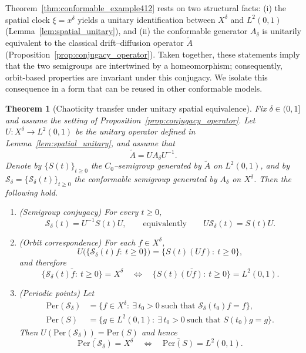 \documentclass[preprint,12pt]{elsarticle}
\newtheorem{theorem}{Theorem}
\begin{document}
Theorem~\ref{thm:conformable_example412} rests on two structural facts:
(i) the spatial clock $\xi=x^\delta$ yields a unitary identification between $X^\delta$
and $L^2(0,1)$ (Lemma~\ref{lem:spatial_unitary}), and
(ii) the conformable generator $A_\delta$ is unitarily equivalent to the classical
drift--diffusion operator $\widetilde A$ (Proposition~\ref{prop:conjugacy_operator}).
Taken together, these statements imply that the two semigroups are intertwined by a
homeomorphism; consequently, orbit-based properties are invariant under this conjugacy.
We isolate this consequence in a form that can be reused in other conformable models.

\begin{theorem}[Chaoticity transfer under unitary spatial equivalence]\label{thm:app_diffusion_transport_2}
Fix $\delta\in(0,1]$ and assume the setting of Proposition~\ref{prop:conjugacy_operator}.
Let $U:X^\delta\to L^2(0,1)$ be the unitary operator defined in Lemma~\ref{lem:spatial_unitary},
and assume that
\begin{equation}\label{eq:app2_generator_equivalence}
\widetilde A = U A_\delta U^{-1}.
\end{equation}
Denote by $\{S(t)\}_{t\ge0}$ the $C_0$--semigroup generated by $\widetilde A$ on $L^2(0,1)$, and by
$\mathcal S_\delta=\{\mathcal S_\delta(t)\}_{t\ge0}$ the conformable semigroup generated by $A_\delta$
on $X^\delta$. Then the following hold.
\begin{enumerate}
\item \emph{(Semigroup conjugacy)} For every $t\ge0$,
\begin{equation}\label{eq:app2_Sdelta_conjugacy}
\mathcal S_\delta(t)=U^{-1}S(t)U,
\qquad\text{equivalently}\qquad
U\mathcal S_\delta(t)=S(t)U .
\end{equation}

\item \emph{(Orbit correspondence)} For each $f\in X^\delta$,
\[
U\bigl(\{\mathcal S_\delta(t)f:\ t\ge0\}\bigr)
=
\{S(t)(Uf):\ t\ge0\},
\]
and therefore
\[
\overline{\{\mathcal S_\delta(t)f:\ t\ge0\}}=X^\delta
\quad\Longleftrightarrow\quad
\overline{\{S(t)(Uf):\ t\ge0\}}=L^2(0,1).
\]

\item \emph{(Periodic points)} Let
\begin{align*}
\mathrm{Per}(\mathcal S_\delta)
&=
\{f\in X^\delta:\ \exists\,t_0>0\ \text{such that }\mathcal S_\delta(t_0)f=f\},\\
\mathrm{Per}(S)
&=
\{g\in L^2(0,1):\ \exists\,t_0>0\ \text{such that }S(t_0)g=g\}.
\end{align*}
Then $U(\mathrm{Per}(\mathcal S_\delta))=\mathrm{Per}(S)$ and hence
\[
\overline{\mathrm{Per}(\mathcal S_\delta)}=X^\delta
\quad\Longleftrightarrow\quad
\overline{\mathrm{Per}(S)}=L^2(0,1).
\]


\end{enumerate}
\end{theorem}
\end{document}
